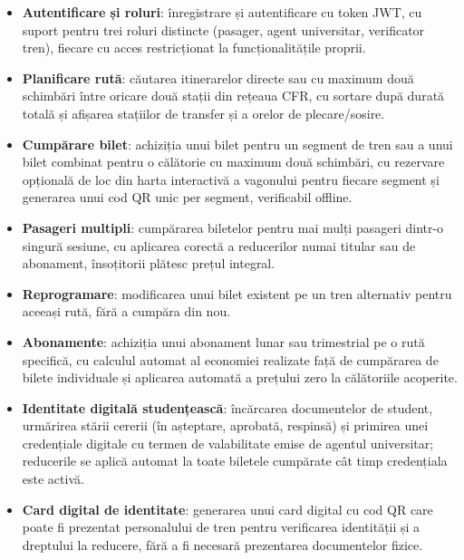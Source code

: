 \documentclass[12pt,a4paper]{report}
\begin{document}
\begin{itemize}
  \item \textbf{Autentificare și roluri}: înregistrare și autentificare cu token JWT, cu suport pentru trei roluri distincte (pasager, agent universitar, verificator tren), fiecare cu acces restricționat la funcționalitățile proprii.

  \item \textbf{Planificare rută}: căutarea itinerarelor directe sau cu maximum două schimbări între oricare două stații din rețeaua CFR, cu sortare după durată totală și afișarea stațiilor de transfer și a orelor de plecare/sosire.

  \item \textbf{Cumpărare bilet}: achiziția unui bilet pentru un segment de tren sau a unui bilet combinat pentru o călătorie cu maximum două schimbări, cu rezervare opțională de loc din harta interactivă a vagonului pentru fiecare segment și generarea unui cod QR unic per segment, verificabil offline.

  \item \textbf{Pasageri multipli}: cumpărarea biletelor pentru mai mulți pasageri dintr-o singură sesiune, cu aplicarea corectă a reducerilor numai titular sau de abonament, însoțitorii plătesc prețul integral.

  \item \textbf{Reprogramare}: modificarea unui bilet existent pe un tren alternativ pentru aceeași rută, fără a cumpăra din nou.

  \item \textbf{Abonamente}: achiziția unui abonament lunar sau trimestrial pe o rută specifică, cu calculul automat al economiei realizate față de cumpărarea de bilete individuale și aplicarea automată a prețului zero la călătoriile acoperite.

  \item \textbf{Identitate digitală studențească}: încărcarea documentelor de student, urmărirea stării cererii (în așteptare, aprobată, respinsă) și primirea unei credențiale digitale cu termen de valabilitate emise de agentul universitar; reducerile se aplică automat la toate biletele cumpărate cât timp credențiala este activă.

  \item \textbf{Card digital de identitate}: generarea unui card digital cu cod QR care poate fi prezentat personalului de tren pentru verificarea identității și a dreptului la reducere, fără a fi necesară prezentarea documentelor fizice.


\end{itemize}
\end{document}

